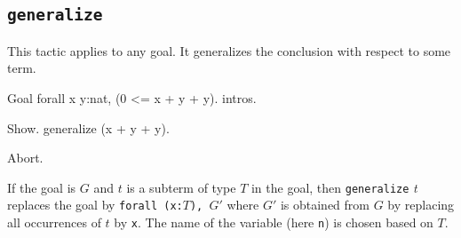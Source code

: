 \begin{coq_example*}
\begin{Variants}

\end{Variants}

\subsection{\tt generalize \term}
\label{generalize}

This tactic applies to any goal. It generalizes the conclusion with
respect to some term.

\Example

\begin{coq_eval}
Goal forall x y:nat, (0 <= x + y + y).
intros.
\end{coq_eval}
\begin{coq_example}
Show.
generalize (x + y + y).
\end{coq_example}

\begin{coq_eval}
Abort.
\end{coq_eval}

If the goal is $G$ and $t$ is a subterm of type $T$ in the goal, then
{\tt generalize} \textit{t} replaces the goal by {\tt forall (x:$T$), $G'$}
where $G'$ is obtained from $G$ by replacing all occurrences of $t$ by
{\tt x}. The name of the variable (here {\tt n}) is chosen based on $T$.

\end{coq_example*}
